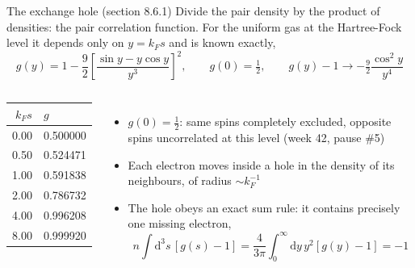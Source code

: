 \documentclass[aspectratio=169,10pt]{beamer}
\newcommand{\dd}{\mathrm{d}}
\begin{document}
\begin{frame}{The exchange hole (section 8.6.1)}
  Divide the pair density by the product of densities: the pair correlation function. For the uniform gas at the Hartree-Fock level it depends only on $y=k_Fs$ and is known exactly,
  \[
    g(y)=1-\frac92\left[\frac{\sin y-y\cos y}{y^3}\right]^2,
    \qquad
    g(0)=\tfrac12,\qquad g(y)-1\to-\tfrac92\frac{\cos^2y}{y^4}
  \]
  \begin{columns}[T]
    \begin{center}\small
    \begin{tabular}{@{}rl@{}}\toprule
    $k_Fs$ & $g$\\\midrule
    0.00 & 0.500000\\
    0.50 & 0.524471\\
    1.00 & 0.591838\\
    2.00 & 0.786732\\
    4.00 & 0.996208\\
    8.00 & 0.999920\\\bottomrule
    \end{tabular}
    \end{center}
    \begin{itemize}
      \item $g(0)=\frac12$: same spins completely excluded, opposite spins uncorrelated at this level (week 42, pause \#5)
      \item Each electron moves inside a hole in the density of its neighbours, of radius $\sim k_F^{-1}$
      \item The hole obeys an \alert{exact sum rule}: it contains precisely one missing electron,
      \[
        n\int\dd^3s\,[g(s)-1]=\frac{4}{3\pi}\int_0^\infty\dd y\,y^2[g(y)-1]=-1
      \]
    \end{itemize}
  \end{columns}
\end{frame}
\end{document}
